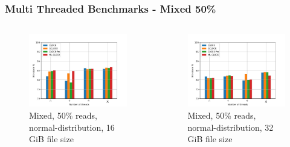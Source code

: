 \documentclass[
	aspectratio=169,
	compress,
]{beamer}
\newcommand{\navframetitle}[1]{\frametitle{#1\hfill{\footnotesize\lastsection{}}}}
\begin{document}

\begin{frame}[fragile]
	\navframetitle{Multi Threaded Benchmarks - Mixed 50\%}

	\begin{columns}
		\begin{column}{0.5\textwidth}
			\begin{figure}[ht]
    			\centering
    			\includegraphics[width=\textwidth]{multi_16_gb_rw_50to50_normal.jpg}
        		\caption{Mixed, 50\% reads, normal-distribution, 16 GiB file size}
			\end{figure}
		\end{column}
		\begin{column}{0.5\textwidth}
			\begin{figure}[ht]
    			\centering
    			\includegraphics[width=\textwidth]{multi_32_gb_rw_50to50_normal.jpg}
        		\caption{Mixed, 50\% reads, normal-distribution, 32 GiB file size}
			\end{figure}			
		\end{column}
	\end{columns}
\end{frame}
\end{document}
